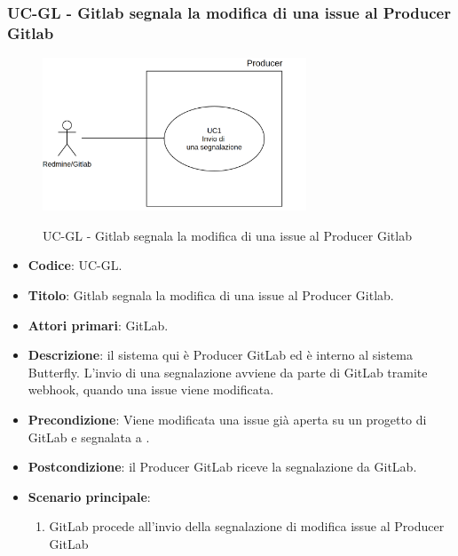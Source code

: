 	
	\subsubsection{UC\theuccount-GL - Gitlab segnala la modifica di una issue al Producer Gitlab}
	\begin{figure}[H]
		\centering
		\includegraphics[width=0.7\textwidth]{img/UC1.png}\\
		\caption{UC\theuccount-GL - Gitlab segnala la modifica di una issue al Producer Gitlab}
	\end{figure}
	\begin{itemize}
		\item \textbf{Codice}: UC\theuccount-GL.
		\item \textbf{Titolo}: Gitlab segnala la modifica di una issue al Producer Gitlab.
		\item \textbf{Attori primari}: GitLab.
		\item \textbf{Descrizione}: il sistema qui è Producer GitLab ed è interno al sistema Butterfly. L'invio di una segnalazione avviene
		da parte di GitLab tramite webhook, quando una issue viene modificata.
		\item \textbf{Precondizione}: Viene modificata una issue già aperta su un
		progetto di GitLab e segnalata a \progetto.
		\item \textbf{Postcondizione}: il Producer GitLab riceve la segnalazione da GitLab.
		\item \textbf{Scenario principale}: 
		\begin{enumerate}
			\item GitLab procede all'invio della segnalazione di modifica issue al Producer GitLab
		\end{enumerate}
		
	\end{itemize}
	
	
